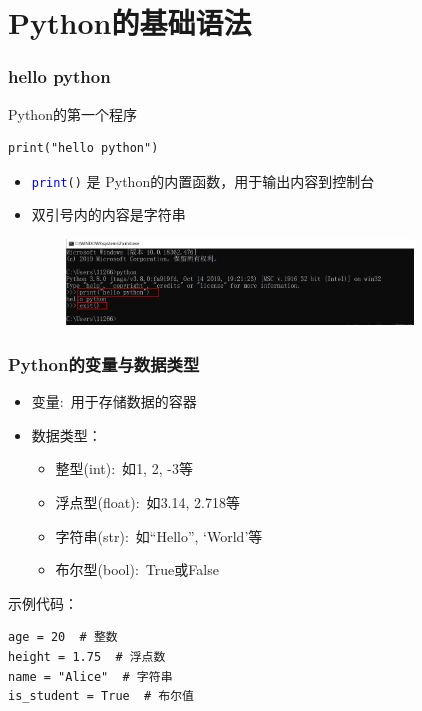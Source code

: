 \section{\rm{Python}的基础语法}
\begin{frame}[fragile]
	\frametitle{\textrm{hello python}}
	\textrm{Python}的第一个程序
    \begin{lstlisting}[style=pythonstyle]
print("hello python")
    \end{lstlisting}
    \begin{itemize}
	    \item \texttt{\textcolor{blue}{print}()} 是 \textrm{Python}的内置函数，用于输出内容到控制台
        \item 双引号内的内容是字符串
    \end{itemize}
\begin{figure}[h!]
\centering
\includegraphics[height=0.9in, width=4.0in, viewport=0 0 1559 387,clip]{Figures/python_command-windows-3.png}
\label{Python-run_hello}
\end{figure}
\end{frame}
%
\begin{frame}[fragile]
	\frametitle{\textrm{Python}的变量与数据类型}
    \begin{itemize}
        \item 变量:~用于存储数据的容器
        \item 数据类型：
            \begin{itemize}
		    \item 整型\textrm{(int)}:~如\textrm{1, 2, -3}等
		    \item 浮点型\textrm{(float)}:~如\textrm{3.14, 2.718}等
		    \item 字符串\textrm{(str)}:~如\textrm{``Hello'', `World'}等
		    \item 布尔型\textrm{(bool)}:~\textrm{True}或\textrm{False}
            \end{itemize}
    \end{itemize}
    示例代码：
    \begin{lstlisting}[style=pythonstyle]
age = 20  # 整数
height = 1.75  # 浮点数
name = "Alice"  # 字符串
is_student = True  # 布尔值
    \end{lstlisting}
\end{frame}

